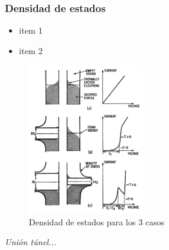 \begin{frame}
\frametitle{Densidad de estados}

\begin{itemize}
	\item{item 1} 
	\item{item 2}
\end{itemize}

\begin{figure}[h!]
\centering
\includegraphics[width=0.45\textwidth]{fermi_levels}
\caption{\small Densidad de estados para los 3 casos
\label{fermi_levels}}
\end{figure}


\begin{center}
\textit{Uni\'on t\'unel...}
\end{center}

\end{frame}